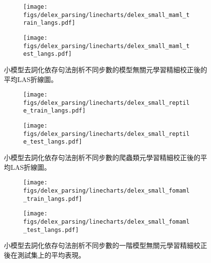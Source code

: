 \begin{figure}[htbp]
    \centering
    \begin{subfigure}[t]{\textwidth}
        \centering
        \texttt{[image: figs/delex\_parsing/linecharts/delex\_small\_maml\_train\_langs.pdf]}
    \end{subfigure}
    \vspace{-12pt}
    \begin{subfigure}[t]{\textwidth}
        \centering
        \texttt{[image: figs/delex\_parsing/linecharts/delex\_small\_maml\_test\_langs.pdf]}
    \end{subfigure}
    \caption{小模型去詞化依存句法剖析不同步數的模型無關元學習精細校正後的平均LAS折線圖。}
    \label{fig:delex_small_avg_maml}
\end{figure}
\begin{figure}[htbp]
    \centering
    \begin{subfigure}[t]{\textwidth}
        \centering
        \texttt{[image: figs/delex\_parsing/linecharts/delex\_small\_reptile\_train\_langs.pdf]}
    \end{subfigure}
    \vspace{-12pt}
    \begin{subfigure}[t]{\textwidth}
        \centering
        \texttt{[image: figs/delex\_parsing/linecharts/delex\_small\_reptile\_test\_langs.pdf]}
    \end{subfigure}
    \caption{小模型去詞化依存句法剖析不同步數的爬蟲類元學習精細校正後的平均LAS折線圖。}
    \label{fig:delex_small_avg_reptile}
\end{figure}
\begin{figure}[htbp]
    \centering
    \begin{subfigure}[t]{\textwidth}
        \centering
        \texttt{[image: figs/delex\_parsing/linecharts/delex\_small\_fomaml\_train\_langs.pdf]}
    \end{subfigure}
    \vspace{-12pt}
    \begin{subfigure}[t]{\textwidth}
        \centering
        \texttt{[image: figs/delex\_parsing/linecharts/delex\_small\_fomaml\_test\_langs.pdf]}
    \end{subfigure}
    \caption{小模型去詞化依存句法剖析不同步數的一階模型無關元學習精細校正後在測試集上的平均表現。}
    \label{fig:delex_small_avg_fomaml}
\end{figure}
